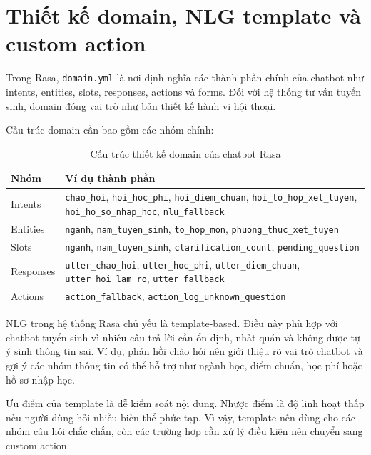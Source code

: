 \section{Thiết kế domain, NLG template và custom action}

Trong Rasa, \texttt{domain.yml} là nơi định nghĩa các thành phần chính của chatbot như intents, entities, slots, responses, actions và forms. Đối với hệ thống tư vấn tuyển sinh, domain đóng vai trò như bản thiết kế hành vi hội thoại.

Cấu trúc domain cần bao gồm các nhóm chính:

\begin{table}[H]
\centering
\begin{tabular}{|p{3.5cm}|p{9cm}|}
\hline
\textbf{Nhóm} & \textbf{Ví dụ thành phần} \\
\hline
Intents & \texttt{chao\_hoi}, \texttt{hoi\_hoc\_phi}, \texttt{hoi\_diem\_chuan}, \texttt{hoi\_to\_hop\_xet\_tuyen}, \texttt{hoi\_ho\_so\_nhap\_hoc}, \texttt{nlu\_fallback} \\
\hline
Entities & \texttt{nganh}, \texttt{nam\_tuyen\_sinh}, \texttt{to\_hop\_mon}, \texttt{phuong\_thuc\_xet\_tuyen} \\
\hline
Slots & \texttt{nganh}, \texttt{nam\_tuyen\_sinh}, \texttt{clarification\_count}, \texttt{pending\_question} \\
\hline
Responses & \texttt{utter\_chao\_hoi}, \texttt{utter\_hoc\_phi}, \texttt{utter\_diem\_chuan}, \texttt{utter\_hoi\_lam\_ro}, \texttt{utter\_fallback} \\
\hline
Actions & \texttt{action\_fallback}, \texttt{action\_log\_unknown\_question} \\
\hline
\end{tabular}
\caption{Cấu trúc thiết kế domain của chatbot Rasa}
\label{tab:rasa-domain-design}
\end{table}

NLG trong hệ thống Rasa chủ yếu là template-based. Điều này phù hợp với chatbot tuyển sinh vì nhiều câu trả lời cần ổn định, nhất quán và không được tự ý sinh thông tin sai. Ví dụ, phản hồi chào hỏi nên giới thiệu rõ vai trò chatbot và gợi ý các nhóm thông tin có thể hỗ trợ như ngành học, điểm chuẩn, học phí hoặc hồ sơ nhập học.

Ưu điểm của template là dễ kiểm soát nội dung. Nhược điểm là độ linh hoạt thấp nếu người dùng hỏi nhiều biến thể phức tạp. Vì vậy, template nên dùng cho các nhóm câu hỏi chắc chắn, còn các trường hợp cần xử lý điều kiện nên chuyển sang custom action.

